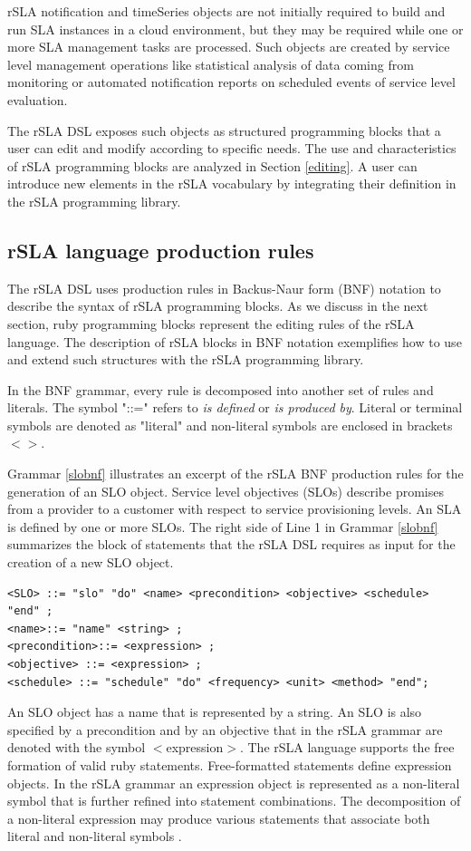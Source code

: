rSLA notification and timeSeries objects are not initially required to build and run SLA instances in a cloud environment, but they may be required while one or more SLA management tasks are processed. Such objects are created by service level management operations like statistical analysis of data coming from monitoring or automated notification reports on scheduled events of service level evaluation. 

The rSLA DSL exposes such objects as structured programming blocks that a user can edit and modify according to specific needs. The use and characteristics of rSLA programming blocks are analyzed in Section \ref{editing}. A user can introduce new elements in the rSLA vocabulary by integrating their definition in the rSLA programming library. 

\subsection{rSLA language production rules}

The rSLA DSL uses production rules in Backus-Naur form (BNF) notation to describe the syntax of rSLA programming blocks. As we discuss in the next section, ruby programming blocks represent the editing rules of the rSLA language. The description of rSLA blocks in BNF notation exemplifies how to use and extend such structures with the rSLA programming library.

In the BNF grammar, every rule is decomposed into another set of rules and literals. The symbol "::=" refers to \textit{is defined} or \textit{is produced by}. Literal or terminal symbols are denoted as "literal" and non-literal symbols are enclosed in brackets $<>$.

Grammar \ref{slobnf} illustrates an excerpt of the rSLA BNF production rules for the generation of an SLO object. Service level objectives (SLOs) describe promises from a provider to a customer with respect to service provisioning levels\cite{wsla}. An SLA is defined by one or more SLOs. The right side of Line 1 in Grammar \ref{slobnf} summarizes the block of statements that the rSLA DSL requires as input for the creation of a new SLO object.
\begin{lstlisting}[caption= Service level objective (SLO) production rules, label=slobnf]
<SLO> ::= "slo" "do" <name> <precondition> <objective> <schedule> "end" ;
<name>::= "name" <string> ;
<precondition>::= <expression> ;
<objective> ::= <expression> ;
<schedule> ::= "schedule" "do" <frequency> <unit> <method> "end";
\end{lstlisting} 
An SLO object has a name that is represented by a string. An SLO is also specified by a precondition and by an objective that in the rSLA grammar are denoted with the symbol $<$expression$>$. 
The rSLA language supports the free formation of valid ruby statements. Free-formatted statements define expression objects. In the rSLA grammar an expression object is represented as a non-literal symbol that is further refined into statement combinations. The decomposition of a non-literal expression may produce various statements that associate both literal and non-literal symbols . 

